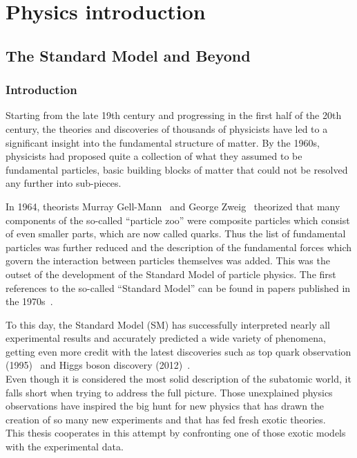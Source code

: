 \part{Physics introduction}
\chapter{The Standard Model and Beyond} \label{Chapter1} 

\section{Introduction}
Starting from the late 19th century and progressing in the first half of the 20th century, 
the theories and discoveries of thousands of physicists have led to a significant insight into the fundamental structure of matter. 
By the 1960s, physicists had proposed quite a collection of what they assumed to be fundamental particles, basic building blocks of matter that could not be resolved any further into sub-pieces. 

In 1964, theorists Murray Gell-Mann~\cite{GELLMANN1964214} and George Zweig~\cite{Zweig:570209} theorized that many components of the so-called ``particle zoo'' were composite particles which consist of even smaller parts, which are now called quarks. Thus the list of fundamental particles was further reduced and the description of the fundamental forces which govern the interaction between particles themselves was added. This was the outset of the development of the Standard Model of particle physics.
The first references to the so-called “Standard Model” can be found in papers published in the 1970s~\cite{Pais:1975gn,PhysRevD.13.680}.

To this day, the Standard Model (SM) has successfully interpreted nearly all experimental results and accurately predicted a wide variety of phenomena, getting even more credit with the latest discoveries such as top quark observation (1995)~\cite{Abachi_1995} and Higgs boson discovery (2012)~\cite{20121,201230}.\\
Even though it is considered the most solid description of the subatomic world, it falls short when trying to address the full picture. Those unexplained physics observations have inspired the big hunt for new physics that has drawn the creation of so many new experiments and that has fed fresh exotic theories. \\
This thesis cooperates in this attempt by confronting one of those exotic models with the experimental data. 


